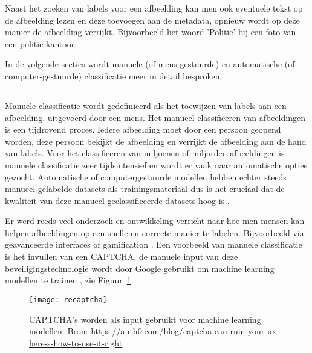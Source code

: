 Naast het zoeken van labels voor een afbeelding kan men ook eventuele tekst op de afbeelding lezen en deze toevoegen aan de metadata, opnieuw wordt op deze manier de afbeelding verrijkt. Bijvoorbeeld het woord 'Politie' bij een foto van een politie-kantoor.

In de volgende secties wordt manuele (of mens-gestuurde) en automatische (of computer-gestuurde) classificatie meer in detail besproken.

\subsection{}
\label{sec:manuele-classificatie}
Manuele classificatie wordt gedefinieerd als het toewijzen van labels aan een afbeelding, uitgevoerd door een mens. Het manueel classificeren van afbeeldingen is een tijdrovend proces. Iedere afbeelding moet door een persoon geopend worden, deze persoon bekijkt de afbeelding en verrijkt de afbeelding aan de hand van labels. Voor het classificeren van miljoenen of miljarden afbeeldingen is manuele classificatie zeer tijdsintensief en wordt er vaak naar automatische opties gezocht. Automatische of computergestuurde modellen hebben echter steeds manueel gelabelde datasets als trainingsmateriaal dus is het cruciaal dat de kwaliteit van deze manueel geclassificeerde datasets hoog is \autocite{JuliaMoehrmann2012}.

Er werd reeds veel onderzoek en ontwikkeling verricht naar hoe men mensen kan helpen afbeeldingen op een snelle en correcte manier te labelen. Bijvoorbeeld via geavanceerde interfaces \autocite{JuliaMoehrmann2012} of gamification \autocite{LuisvonAhn2004}. Een voorbeeld van manuele classificatie is het invullen van een CAPTCHA, de manuele input van deze beveiligingstechnologie wordt door Google gebruikt om machine learning modellen te trainen \autocite{Google2021}, zie Figuur~\ref{fig:captcha}.

\begin{figure}
    \centering    
    \texttt{[image: recaptcha]}
    \caption{CAPTCHA's worden als input gebruikt voor machine learning modellen. Bron: \url{https://auth0.com/blog/captcha-can-ruin-your-ux-here-s-how-to-use-it-right}}
    \label{fig:captcha}
\end{figure}

